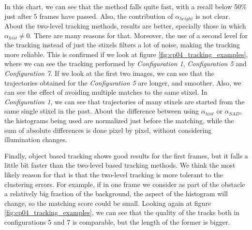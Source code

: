 In this chart, we can see that the \cite{gunyel2012stixels} method falls quite fast, with a recall below 50\% just after 5 frames have passed. Also, the contribution of $\alpha_{height}$ is not clear. About the two-level tracking methods, results are better, specially those in which $\alpha_{hist} \neq 0$. There are many reasons for that. Moreover, the use of a second level for the tracking instead of just the stixels filters a lot of noise, making the tracking more reliable. This is confirmed if we look at figure \ref{fig:cp04_tracking_examples}, where we can see the tracking performed by \emph{Configuration 1}, \emph{Configuration 5} and \emph{Configuration 7}. If we look at the first two images, we can see that the trajectories obtained for the \emph{Configuration 5} are longer, and smoother. Also, we can see the effect of avoiding multiple matches to the same stixel. In \emph{Configuration 1}, we can see that trajectories of many stixels are started from the same single stixel in the past. About the difference between using $\alpha_{hist}$ or $\alpha_{SAD}$, the histograms being used are normalized just before the matching, while the sum of absolute differences is done pixel by pixel, without considering illumination changes.

Finally, object based tracking shows good results for the first frames, but it falls a little bit faster than the two-level based tracking methods. We think the most likely reason for that is that the two-level tracking is more tolerant to the clustering errors. For example, if in one frame we consider as part of the obstacle a relatively big fraction of the background, the aspect of the histogram will change, so the matching score could be small. Looking again at figure \ref{fig:cp04_tracking_examples}, we can see that the quality of the tracks both in configurations 5 and 7 is comparable, but the length of the former is bigger.

